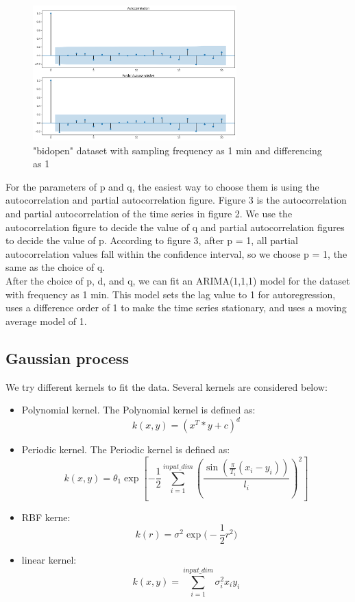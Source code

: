 \documentclass[12pt]{article}
\begin{document}
\begin{figure}[H]
\centering 
\includegraphics[width=0.7\textwidth]{fig/section3/m1_400to500_choose_parameters.png}
\centering 
\caption{"bidopen" dataset with sampling frequency as 1 min and differencing as 1}
\label{fig:grammar}
\end{figure}

For the parameters of p and q, the easiest way to choose them is using the autocorrelation and partial autocorrelation figure. Figure 3 is the autocorrelation and partial autocorrelation of the time series in figure 2. We use the autocorrelation figure to decide the value of q and partial autocorrelation figures to decide the value of p. According to figure 3, after p = 1, all partial autocorrelation values fall within the confidence interval, so we choose p = 1, the same as the choice of q.\\

After the choice of p, d, and q, we can fit an ARIMA(1,1,1) model for the dataset with frequency as 1 min. This model sets the lag value to 1 for autoregression, uses a difference order of 1 to make the time series stationary, and uses a moving average model of 1.

\subsection{Gaussian process}

We try different kernels to fit the data. Several kernels are considered below:
\begin{itemize}
    \item Polynomial kernel.
    The Polynomial kernel is defined as:
$$k(x,y)=(x^T*y+c)^d$$

\item Periodic kernel.
The Periodic kernel is defined as:
$$ k(x,y) = \theta_1 \exp \left[  - \frac{1}{2} \sum_{i=1}^{input\_dim}
       \left( \frac{\sin(\frac{\pi}{T_i} (x_i - y_i) )}{l_i} \right)^2 \right]$$
       
\item RBF kerne:
$$k(r) = \sigma^2 \exp \bigg(- \frac{1}{2} r^2 \bigg)$$
    
\item linear kernel:
$$k(x,y) =\sum_{i=1} ^{input\_dim}\sigma^2_i x_iy_i$$

\end{itemize}
\end{document}
